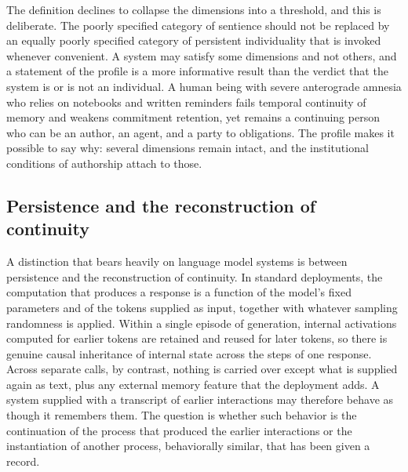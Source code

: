 \documentclass[12pt]{article}
\theoremstyle{definition}
\theoremstyle{plain}
\begin{document}
The definition declines to collapse the dimensions into a threshold, and this is deliberate. The poorly specified category of sentience should not be replaced by an equally poorly specified category of persistent individuality that is invoked whenever convenient. A system may satisfy some dimensions and not others, and a statement of the profile is a more informative result than the verdict that the system is or is not an individual. A human being with severe anterograde amnesia who relies on notebooks and written reminders fails temporal continuity of memory and weakens commitment retention, yet remains a continuing person who can be an author, an agent, and a party to obligations. The profile makes it possible to say why: several dimensions remain intact, and the institutional conditions of authorship attach to those.

\subsection{Persistence and the reconstruction of continuity}

A distinction that bears heavily on language model systems is between persistence and the reconstruction of continuity. In standard deployments, the computation that produces a response is a function of the model's fixed parameters and of the tokens supplied as input, together with whatever sampling randomness is applied. Within a single episode of generation, internal activations computed for earlier tokens are retained and reused for later tokens, so there is genuine causal inheritance of internal state across the steps of one response. Across separate calls, by contrast, nothing is carried over except what is supplied again as text, plus any external memory feature that the deployment adds. A system supplied with a transcript of earlier interactions may therefore behave as though it remembers them. The question is whether such behavior is the continuation of the process that produced the earlier interactions or the instantiation of another process, behaviorally similar, that has been given a record.
\end{document}
